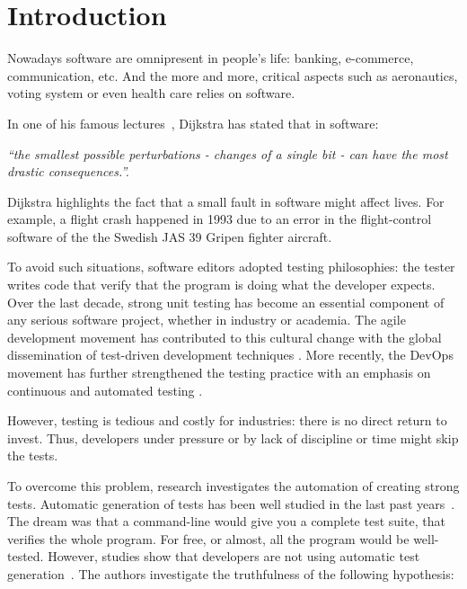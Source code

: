 \chapter{Introduction}
\label{chap:introduction}

\minitoc

\graphicspath{{.}{chapitres/introduction/}}

Nowadays software are omnipresent in people's life: banking, e-commerce, communication, etc. 
And the more and more, critical aspects such as aeronautics, voting system or even health care relies on software.

In one of his famous lectures~\cite{DijkstraLecture1989}, Dijkstra has stated that in software: 
\begin{center}
	\emph{``the smallest possible perturbations - \ie changes of a single bit - can have the most drastic consequences.''.}
\end{center}

Dijkstra highlights the fact that a small fault in software might affect lives.
For example, a flight crash happened in 1993 due to an error in the flight-control software of the the Swedish JAS 39 Gripen fighter aircraft.

To avoid such situations, software editors adopted testing philosophies: the tester writes code that verify that the program is doing what the developer expects.
Over the last decade, strong unit testing has become an essential component of any serious software project, whether in industry or academia.
The agile development movement has contributed to this cultural change with the global dissemination of test-driven development techniques \cite{beck2003test}.
More recently, the DevOps movement has further strengthened the testing practice with an emphasis on continuous and automated testing \cite{Roche2013Devops}.

However, testing is tedious and costly for industries: there is no direct return to invest.
Thus, developers under pressure or by lack of discipline or time might skip the tests.

To overcome this problem, research investigates the automation of creating strong tests.
Automatic generation of tests has been well studied in the last past years~\cite{ESECFSE11, PachecoE2005}.
The dream was that a command-line would give you a complete test suite, that verifies the whole program.
For free, or almost, all the program would be well-tested.
However, studies show that developers are not using automatic test generation~\cite{TOSEM_userstudy}.
The authors investigate the truthfulness of the following hypothesis:

